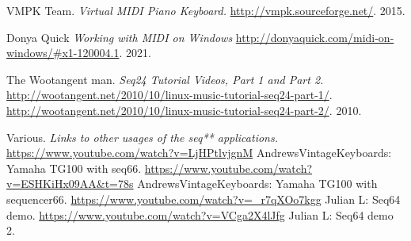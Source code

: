 {\begin{thebibliography}{99}
   VMPK Team.
   \emph{Virtual MIDI Piano Keyboard.}
   \url{http://vmpk.sourceforge.net/}.
   2015.

   Donya Quick
   \emph{Working with MIDI on Windows}
   \url{http://donyaquick.com/midi-on-windows/#x1-120004.1}.
   2021.

   The Wootangent man.
   \emph{Seq24 Tutorial Videos, Part 1 and Part 2.}
   \url{http://wootangent.net/2010/10/linux-music-tutorial-seq24-part-1/}.
   \url{http://wootangent.net/2010/10/linux-music-tutorial-seq24-part-2/}.
   2010.

   Various.
   \emph{Links to other usages of the seq** applications.}
   \url{https://www.youtube.com/watch?v=LjHPtlvjgnM}
      AndrewsVintageKeyboards: Yamaha TG100 with seq66.
   \url{https://www.youtube.com/watch?v=ESHKiHx09AA&t=78s}
      AndrewsVintageKeyboards: Yamaha TG100 with sequencer66.
   \url{https://www.youtube.com/watch?v=\_r7qXOo7kgg}
      Julian L: Seq64 demo.
   \url{https://www.youtube.com/watch?v=VCga2X4lJfg}
      Julian L: Seq64 demo 2.
\end{thebibliography}
}

